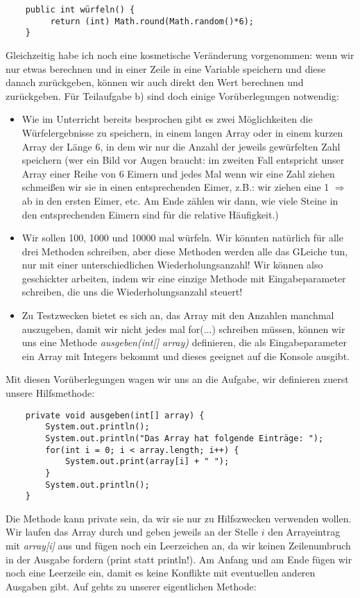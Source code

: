 \documentclass{article}
\begin{document}
\begin{verbatim}
    public int würfeln() {
         return (int) Math.round(Math.random()*6);
    }
\end{verbatim}
Gleichzeitig habe ich noch eine kosmetische Veränderung vorgenommen: wenn wir nur etwas berechnen und in einer Zeile in eine Variable speichern und diese danach zurückgeben, können wir auch direkt den Wert berechnen und zurückgeben. 
\vspace{0.5cm}
Für Teilaufgabe b) sind doch einige Vorüberlegungen notwendig:
\begin{itemize}
    \item Wie im Unterricht bereits besprochen gibt es zwei Möglichkeiten die Würfelergebnisse zu speichern, in einem langen Array oder in einem kurzen Array der Länge 6, in dem wir nur die Anzahl der jeweils gewürfelten Zahl speichern (wer ein Bild vor Augen braucht: im zweiten Fall entspricht unser Array einer Reihe von 6 Eimern und jedes Mal wenn wir eine Zahl ziehen schmeißen wir sie in einen entsprechenden Eimer, z.B.: wir ziehen eine 1 $\Rightarrow$ ab in den ersten Eimer, etc. Am Ende zählen wir dann, wie viele Steine in den entsprechenden Eimern sind für die relative Häufigkeit.)
    \item Wir sollen 100, 1000 und 10000 mal würfeln. Wir könnten natürlich für alle drei Methoden schreiben, aber diese Methoden werden alle das GLeiche tun, nur mit einer unterschiedlichen Wiederholungsanzahl! Wir können also geschickter arbeiten, indem wir eine einzige Methode mit Eingabeparameter schreiben, die uns die Wiederholungsanzahl steuert!
    \item Zu Testzwecken bietet es sich an, das Array mit den Anzahlen manchmal auszugeben, damit wir nicht jedes mal for(...) schreiben müssen, können wir uns eine Methode \textit{ausgeben(int[] array)} definieren, die als Eingabeparameter ein Array mit Integers bekommt und dieses geeignet auf die Konsole ausgibt.
\end{itemize}
Mit diesen Vorüberlegungen wagen wir uns an die Aufgabe, wir definieren zuerst unsere Hilfsmethode:
\begin{verbatim}
    private void ausgeben(int[] array) {
        System.out.println();
        System.out.println("Das Array hat folgende Einträge: ");
        for(int i = 0; i < array.length; i++) {
            System.out.print(array[i] + " ");
        }
        System.out.println();
    }
\end{verbatim}
Die Methode kann private sein, da wir sie nur zu Hilfszwecken verwenden wollen. Wir laufen das Array durch und geben jeweils an der Stelle $i$ den Arrayeintrag mit \textit{array[i]} aus und fügen noch ein Leerzeichen an, da wir keinen Zeilenumbruch in der Ausgabe fordern (print statt println!). Am Anfang und am Ende fügen wir noch eine Leerzeile ein, damit es keine Konflikte mit eventuellen anderen Ausgaben gibt. Auf gehts zu unserer eigentlichen Methode:
\end{document}
